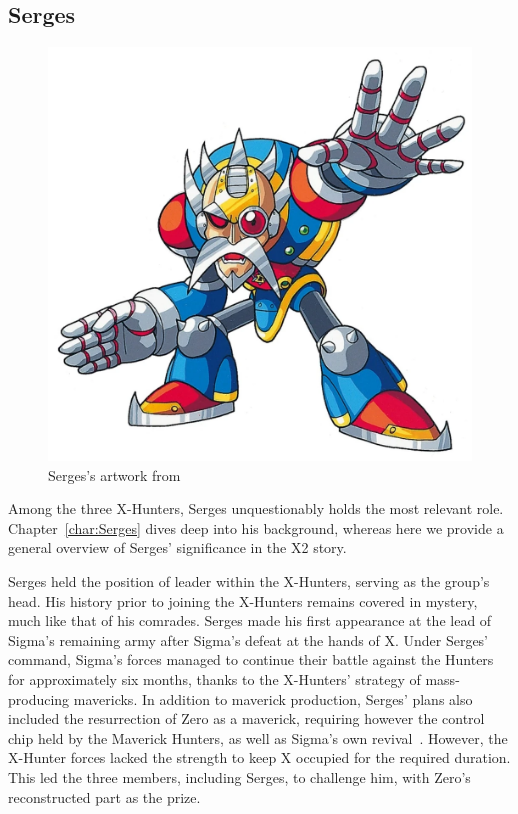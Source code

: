 \subsection{Serges}\label{boss:Serges}
\begin{figure}[htp]
	\centering
	\includegraphics[height=\portraitsize]{figures/Characters/Char_Serges.png}
	\caption{Serges's artwork from \cite{book:MMX_Complete_art}}
\end{figure}
Among the three X-Hunters, Serges unquestionably holds the most relevant role. Chapter~\ref{char:Serges} dives deep into his background, whereas here we provide a general overview of Serges' significance in the X2 story.

Serges held the position of leader within the X-Hunters, serving as the group's head. His history prior to joining the X-Hunters remains covered in mystery, much like that of his comrades. Serges made his first appearance at the lead of Sigma's remaining army after Sigma's defeat at the hands of X. Under Serges' command, Sigma's forces managed to continue their battle against the Hunters for approximately six months, thanks to the X-Hunters' strategy of mass-producing mavericks. In addition to maverick production, Serges' plans also included the resurrection of Zero as a maverick, requiring however the control chip held by the Maverick Hunters, as well as Sigma's own revival~\cite{wayback:X2_resources}. However, the X-Hunter forces lacked the strength to keep X occupied for the required duration. This led the three members, including Serges, to challenge him, with Zero's reconstructed part as the prize.

